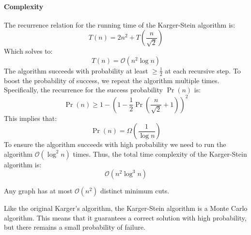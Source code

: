 \paragraph*{Complexity}
The recurrence relation for the running time of the Karger-Stein algorithm is:
\[T(n) = 2n^2 + T\left(\frac{n}{\sqrt{2}}\right)\]
Which solves to:
\[T(n) = \mathcal{O}(n^2 \log n)\]
The algorithm succeeds with probability at least $\geq \frac{1}{2}$ at each recursive step. 
To boost the probability of success, we repeat the algorithm multiple times. 
Specifically, the recurrence for the success probability $\Pr(n)$ is: 
\[\Pr(n) \geq 1 - \left( 1 - \frac{1}{2}\Pr\left(\frac{n}{\sqrt{2}} + 1\right)\right)^2\]
This implies that:
\[\Pr(n) = \Omega\left(\frac{1}{\log n}\right)\]
To ensure the algorithm succeeds with high probability we need to run the algorithm $\mathcal{O}(\log^2 n)$ times. 
Thus, the total time complexity of the Karger-Stein algorithm is: 
\[\mathcal{O}(n^2 \log^3 n)\]
\begin{corollary}
    Any graph has at most $\mathcal{O}(n^2)$ distinct minimum cuts.
\end{corollary}
Like the original Karger's algorithm, the Karger-Stein algorithm is a Monte Carlo algorithm. 
This means that it guarantees a correct solution with high probability, but there remains a small probability of failure.